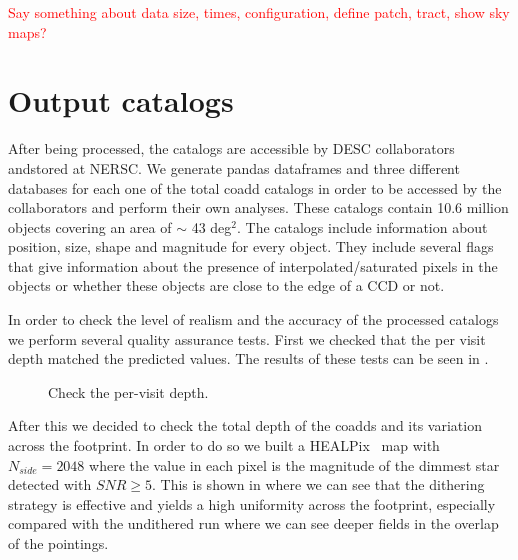\documentclass[\docopts]{\docclass}
\begin{document}
\textcolor{red}{Say something about data size, times, configuration, define patch, tract, show sky maps?}

\section{Output catalogs}
\label{sec:catalogs}

After being processed, the catalogs are accessible by DESC collaborators andstored at NERSC. We generate pandas
dataframes and three different databases for each one of the total coadd catalogs in order to be accessed by the
collaborators and perform their own analyses. These catalogs contain 10.6 million objects covering an area
of $\sim$ 43 deg$^{2}$. The catalogs include information about position, size, shape and magnitude for every object.
They include several flags that give information about the presence of interpolated/saturated pixels in the objects
or whether these objects are close to the edge of a CCD or not.

In order to check the level of realism and the accuracy of the processed catalogs we perform several quality assurance tests.
First we checked that the per visit depth matched the predicted values. The results of these tests can be seen in
.

\begin{figure}
  \centering
  \caption{Check the per-visit depth.}
  \label{fig:depth_check_a}
\end{figure}

After this we decided to check the total depth of the coadds and its variation across the footprint. In order to do so we built
a HEALPix~\citep{2005ApJ...622..759G} map with $N_{side}=2048$ where the value in each pixel is the magnitude of the dimmest star
detected with $SNR \geq 5$. This is shown in  where we can see that the dithering strategy is effective and
yields a high uniformity across the footprint, especially compared with the undithered run where we can see deeper fields
in the overlap of the pointings.
\end{document}
